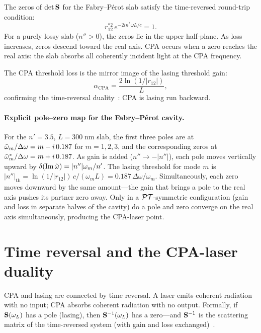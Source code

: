The zeros of $\det\mathbf{S}$ for the Fabry--P\'erot slab satisfy the
time-reversed round-trip condition:
\begin{equation}
 r_{12}^{*2}\,e^{-2in^*\omega L/c} = 1.
 \label{eq:fp-zero-condition}
\end{equation}
For a purely lossy slab ($n'' > 0$), the zeros lie in the upper
half-plane. As loss increases, zeros descend toward the real axis.
CPA occurs when a zero reaches the real axis: the slab absorbs all
coherently incident light at the CPA frequency.

The CPA threshold loss is the mirror image of the lasing threshold gain:
\begin{equation}
 \alpha_{\mathrm{CPA}} = \frac{2\ln(1/|r_{12}|)}{L},
 \label{eq:fp-cpa-threshold}
\end{equation}
confirming the time-reversal duality~\cite{sweeney2019perfectly,wang2021coherent}: CPA is lasing run backward.

\paragraph{Explicit pole--zero map for the Fabry--P\'erot cavity.}
For the $n' = 3.5$, $L = 300\;$nm slab, the first three poles are at
$\tilde{\omega}_m/\Delta\omega = m - i\,0.187$ for $m = 1, 2, 3$, and the
corresponding zeros at $\tilde{\omega}_m^*/\Delta\omega = m + i\,0.187$. As
gain is added ($n'' \to -|n''|$), each pole moves vertically upward by
$\delta(\operatorname{Im}\tilde{\omega}) = |n''|\omega_m/n'$. The lasing threshold for
mode $m$ is $|n''|_{\mathrm{th}} = \ln(1/|r_{12}|)\,c/(\omega_m L)
= 0.187\,\Delta\omega/\omega_m$. Simultaneously, each zero moves
downward by the same amount---the gain that brings a pole to the real
axis pushes its partner zero away. Only in a $\mathcal{PT}$-symmetric
configuration (gain and loss in separate halves of the cavity) do a
pole and zero converge on the real axis simultaneously, producing the
CPA-laser point.

\section{Time reversal and the CPA-laser duality}
\label{sec:time-reversal}

CPA and lasing are connected by time reversal. A laser emits coherent
radiation with no input; CPA absorbs coherent radiation with no output.
Formally, if $\mathbf{S}(\omega_L)$ has a pole (lasing), then
$\mathbf{S}^{-1}(\omega_L)$ has a zero---and $\mathbf{S}^{-1}$ is the scattering
matrix of the time-reversed system (with gain and loss
exchanged)~\cite{chong2010symmetry}.

